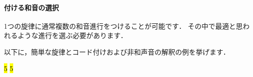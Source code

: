 \documentclass[dvipdfmx,uplatex,b5paper,openany,jbase=12Q,nomag*,textwidth-limit=44%
               ]{gachimuchi}[2020/05/05]
\begin{document}
\paragraph{付ける和音の選択}
1つの旋律に通常複数の和音進行をつけることが可能です．
その中で最適と思われるような進行を選ぶ必要があります．

以下に，簡単な旋律とコード付けおよび非和声音の解釈の例を挙げます．

\begin{Music}[\linewidth]
  \nostartrule%
  \generalmeter{\meterC}%
  \Startpiece%
  \NOtes%
  \en\Notes%
  \en\xbar%
  \NOtes%
  \en\Notes%
  \en\NOtesp%
  \en\Notes%
  \en\xbar%
  \NOtes%
  \en\Notes%
  \en\xbar%
  \NOtes%
  \en\Notes%
  \en\NOTes%
  \hl{5}%
  \en\setdoublebar%
  \endpiece%
  \generalmeter{\meterC}%
  \Startpiece%
  \NOtes%
  \en\Notes%
  \cchordsl{\Cross}%
  \cchordsl{\Cross}%
  \cchordsl{\Cross}%
  \en\xbar%
  \NOtes%
  \en\Notes%
  \cchordsl{\Cross}%
  \en\NOtesp%
  \en\Notes%
  \en\xbar%
  \NOtes{}%
  \en\Notes%
  \cchordsl{\Cross}%
  \cchordsl{\Cross}%
  \cchordsl{\Cross}%
  \en\xbar%
  \NOtes%
  \en\Notes%
  \cchordsl{\Cross}%
  \cchordsl{\Cross}%
  \en\NOTes%
  \hl{5}%
  \en\setdoublebar%
  \endpiece%
  \generalmeter{\meterC}%
  \Startpiece%
  \NOtes%
  \cchordsl{\Cross}%
  \en\Notes%
  \cchordsl{\Cross}%
  \cchordsl{\Cross}%
  \cchordsl{\Cross}%
  \en\xbar%
  \NOtes%
  \cchordsl{\Cross}%
  \en\Notes%
  \cchordsl{(\Cross)}%
  \en\NOtesp%
  \en\Notes%

\end{Music}
\end{document}
